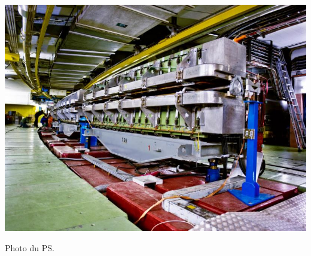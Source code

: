 \marginpar
{
	
	\includegraphics[width=\marginparwidth]{LHC/ps.jpg}
    \captionsetup{type=figure}\caption{Photo du PS.}
    	\label{ps}
}

